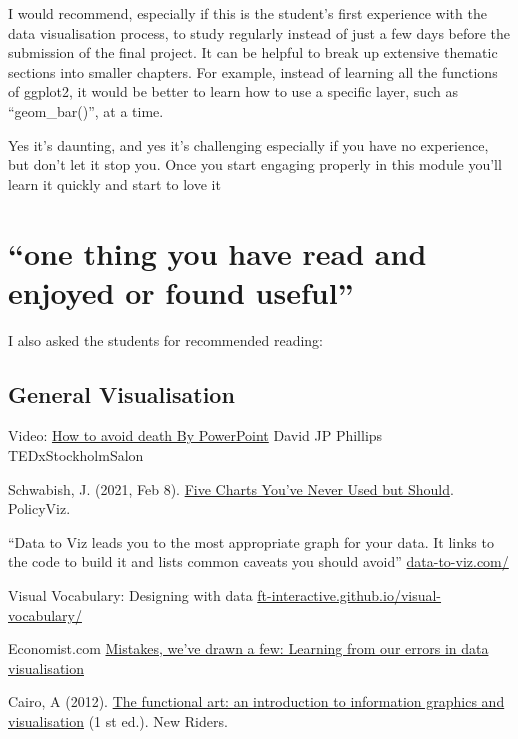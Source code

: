\documentclass[
]{book}
\begin{document}
I would recommend, especially if this is the student's first experience with the data visualisation process, to study regularly instead of just a few days before the submission of the final project. It can be helpful to break up extensive thematic sections into smaller chapters. For example, instead of learning all the functions of ggplot2, it would be better to learn how to use a specific layer, such as ``geom\_bar()'', at a time.

Yes it's daunting, and yes it's challenging especially if you have no experience, but don't let it stop you. Once you start engaging properly in this module you'll learn it quickly and start to love it

\hypertarget{one-thing-you-have-read-and-enjoyed-or-found-useful}{%
\section{``one thing you have read and enjoyed or found useful''}\label{one-thing-you-have-read-and-enjoyed-or-found-useful}}

I also asked the students for recommended reading:

\hypertarget{general-visualisation}{%
\subsection{General Visualisation}\label{general-visualisation}}

Video: \href{https://www.youtube.com/watch?v=Iwpi1Lm6dFo}{How to avoid death By PowerPoint} \textbar{} David JP Phillips \textbar{} TEDxStockholmSalon

Schwabish, J. (2021, Feb 8). \href{https://policyviz.\%20com/2021/02/08/five-charts-youve-never-used-but-should/}{Five Charts You've Never Used but Should}. PolicyViz.

``Data to Viz leads you to the most appropriate graph for your data. It links to the code to build it and lists common caveats you should avoid'' \href{https://www.data-to-viz.com/}{data-to-viz.com/}

Visual Vocabulary: Designing with data \href{https://ft-interactive.github.io/visual-vocabulary/}{ft-interactive.github.io/visual-vocabulary/}

Economist.com \href{https://medium.economist.com/mistakes-weve-drawn-a-few-8cdd8a42d368}{Mistakes, we've drawn a few: Learning from our errors in data visualisation}

Cairo, A (2012). \href{http://www.thefunctionalart.com/}{The functional art: an introduction to information graphics and visualisation} (1 st ed.). New Riders.
\end{document}
